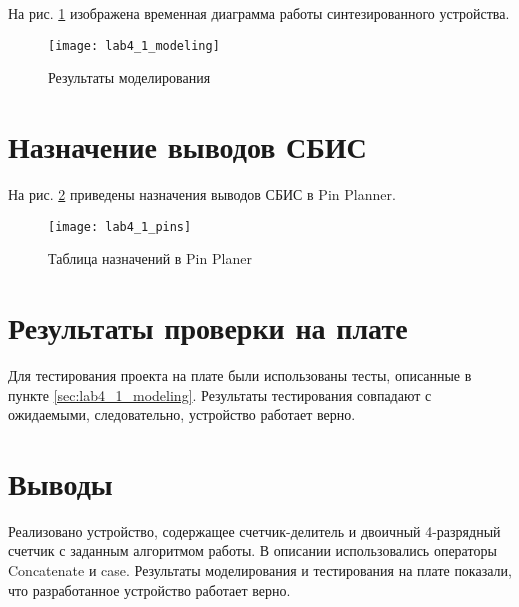 На рис. \ref{fig:lab4_1_modeling} изображена временная диаграмма работы синтезированного устройства.

\begin{figure}[H]
\begin{center}
	\texttt{[image: lab4\_1\_modeling]}
	\caption{Результаты моделирования}
	\label{fig:lab4_1_modeling}
\end{center}
\end{figure}

\newpage

\section{Назначение выводов СБИС}

На рис. \ref{fig:lab4_1_pins} приведены назначения выводов СБИС в Pin Planner.

\begin{figure}[H]
\begin{center}
	\texttt{[image: lab4\_1\_pins]}
	\caption{Таблица назначений в Pin Planer}
	\label{fig:lab4_1_pins}
\end{center}
\end{figure}

\section{Результаты проверки на плате}

Для тестирования проекта на плате были использованы тесты, описанные в пункте \ref{sec:lab4_1_modeling}. Результаты тестирования совпадают с ожидаемыми, следовательно, устройство работает верно.

\section{Выводы}

Реализовано устройство, содержащее счетчик-делитель и двоичный 4-разрядный счетчик с заданным алгоритмом работы. В описании использовались операторы Concatenate и case. Результаты моделирования и тестирования на плате показали, что разработанное устройство работает верно.

